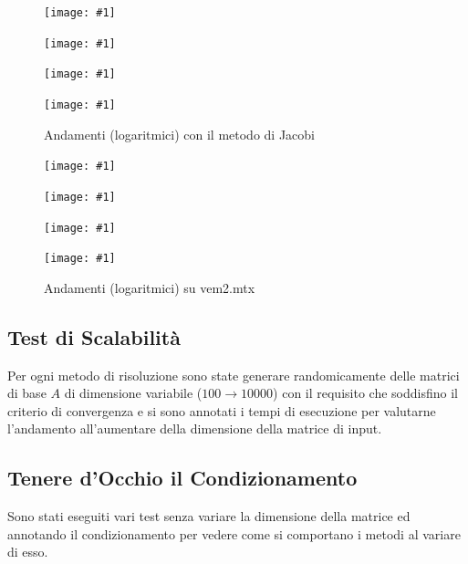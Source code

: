 \documentclass[a4paper,11pt,oneside, table]{article}
\newcommand{\putsubimage}[5] {
  \begin{minipage}{{#4}\linewidth}
	    \centering
      \texttt{[image: \#1]}
	    \caption{#2}\label{#3}
	\end{minipage}
}
\newcommand{\putimagequadruple}[4] {
  \begin{figure}[!htb]
      \centering
      #1
      \hspace{0.5cm}
      #2
      \linebreak
      #3
      \hspace{0.5cm}
      #4
  \end{figure}
}
\begin{document}
\putimagequadruple
  {\putsubimage{./images/it-re-cge.png}{Andamenti (logaritmici) con il metodo del Gradiente Coniugato}{png:it-re-cge}{0.4}{0.8}}
  {\putsubimage{./images/it-re-gre.png}{Andamenti (logaritmici) con il metodo del Gradiente}{png:it-re-gre}{0.4}{0.8}}
  {\putsubimage{./images/it-re-gse.png}{Andamenti (logaritmici) con il metodo di Gauss Seidel}{png:it-re-gse}{0.4}{0.8}}
  {\putsubimage{./images/it-re-jae.png}{Andamenti (logaritmici) con il metodo di Jacobi}{png:it-re-jae}{0.4}{0.8}}

\putimagequadruple
  {\putsubimage{./images/it-re-spa1.png}{Andamenti (logaritmici) su spa1.mtx}{png:it-re-spa1}{0.4}{0.8}}
  {\putsubimage{./images/it-re-spa2.png}{Andamenti (logaritmici) su spa2.mtx}{png:it-re-spa2}{0.4}{0.8}}
  {\putsubimage{./images/it-re-vem1.png}{Andamenti (logaritmici) su vem1.mtx}{png:it-re-vem1}{0.4}{0.8}}
  {\putsubimage{./images/it-re-vem2.png}{Andamenti (logaritmici) su vem2.mtx}{png:it-re-vem2}{0.4}{0.8}}

\subsection{Test di Scalabilit\`a}

Per ogni metodo di risoluzione sono state generare randomicamente delle matrici di base $A$ di dimensione variabile ($100 \rightarrow 10000$) con il requisito che soddisfino il criterio di convergenza e si sono annotati i tempi di esecuzione per valutarne l'andamento all'aumentare della dimensione della matrice di input.

\subsection{Tenere d'Occhio il Condizionamento}

Sono stati eseguiti vari test senza variare la dimensione della matrice ed annotando il condizionamento per vedere come si comportano i metodi al variare di esso.

\printbibliography[title={Bibliografia}]
\end{document}
